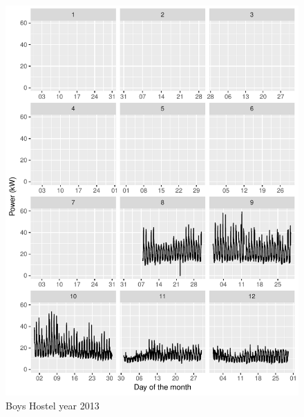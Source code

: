 \documentclass[11pt, oneside]{article}   	%
\begin{document}
\begin{figure}
\includegraphics[keepaspectratio]{boys_hostel_year2013.pdf}
\caption{Boys Hostel year 2013}
\end{figure}
\end{document}

